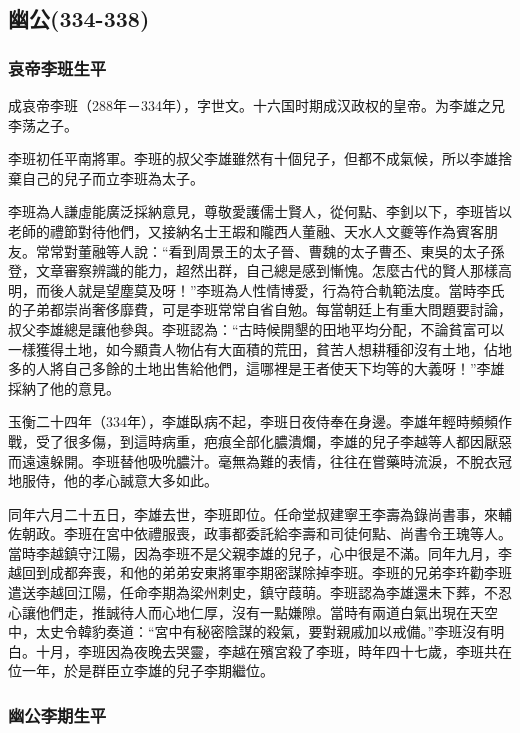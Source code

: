 
\subsection{幽公\tiny(334-338)}

\subsubsection{哀帝李班生平}

成哀帝李班（288年－334年），字世文。十六国时期成汉政权的皇帝。为李雄之兄李荡之子。

李班初任平南將軍。李班的叔父李雄雖然有十個兒子，但都不成氣候，所以李雄捨棄自己的兒子而立李班為太子。

李班為人謙虛能廣泛採納意見，尊敬愛護儒士賢人，從何點、李釗以下，李班皆以老師的禮節對待他們，又接納名士王嘏和隴西人董融、天水人文夔等作為賓客朋友。常常對董融等人說：“看到周景王的太子晉、曹魏的太子曹丕、東吳的太子孫登，文章審察辨識的能力，超然出群，自己總是感到慚愧。怎麼古代的賢人那樣高明，而後人就是望塵莫及呀！”李班為人性情博愛，行為符合軌範法度。當時李氏的子弟都崇尚奢侈靡費，可是李班常常自省自勉。每當朝廷上有重大問題要討論，叔父李雄總是讓他參與。李班認為：“古時候開墾的田地平均分配，不論貧富可以一樣獲得土地，如今顯貴人物佔有大面積的荒田，貧苦人想耕種卻沒有土地，佔地多的人將自己多餘的土地出售給他們，這哪裡是王者使天下均等的大義呀！”李雄採納了他的意見。

玉衡二十四年（334年），李雄臥病不起，李班日夜侍奉在身邊。李雄年輕時頻頻作戰，受了很多傷，到這時病重，疤痕全部化膿潰爛，李雄的兒子李越等人都因厭惡而遠遠躲開。李班替他吸吮膿汁。毫無為難的表情，往往在嘗藥時流淚，不脫衣冠地服侍，他的孝心誠意大多如此。

同年六月二十五日，李雄去世，李班即位。任命堂叔建寧王李壽為錄尚書事，來輔佐朝政。李班在宮中依禮服喪，政事都委託給李壽和司徒何點、尚書令王瑰等人。當時李越鎮守江陽，因為李班不是父親李雄的兒子，心中很是不滿。同年九月，李越回到成都奔喪，和他的弟弟安東將軍李期密謀除掉李班。李班的兄弟李玝勸李班遣送李越回江陽，任命李期為梁州刺史，鎮守葭萌。李班認為李雄還未下葬，不忍心讓他們走，推誠待人而心地仁厚，沒有一點嫌隙。當時有兩道白氣出現在天空中，太史令韓豹奏道：“宮中有秘密陰謀的殺氣，要對親戚加以戒備。”李班沒有明白。十月，李班因為夜晚去哭靈，李越在殯宮殺了李班，時年四十七歲，李班共在位一年，於是群臣立李雄的兒子李期繼位。

\subsubsection{幽公李期生平}

